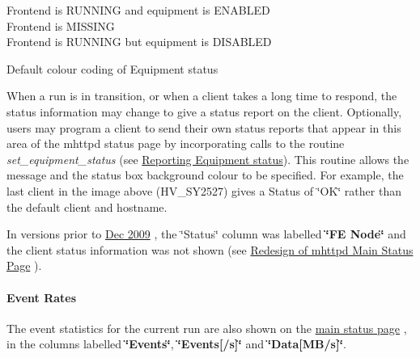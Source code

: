 \begin{center} \begin{table}[h]\begin{TabularC}{1}
\hline
Frontend is RUNNING and equipment is ENABLED  \\
Frontend is MISSING   \\
Frontend is RUNNING but equipment is DISABLED \\
\end{TabularC}
\centering
\caption{Default colour coding of Equipment status }
\end{table}
\par
 \end{center} 

When a run is in transition, or when a client takes a long time to respond, the status information may change to give a status report on the client. Optionally, users may program a client to send their own status reports that appear in this area of the mhttpd status page by incorporating calls to the routine {\itshape set\_\-equipment\_\-status\/} (see \hyperlink{FE_sequence_FE_frontend_status}{Reporting Equipment status}). This routine allows the message and the status box background colour to be specified. For example, the last client in the image above (HV\_\-SY2527) gives a Status of \char`\"{}OK\char`\"{} rather than the default client and hostname.

In versions prior to \hyperlink{NDF_ndf_dec_2009}{Dec 2009} , the \char`\"{}Status\char`\"{} column was labelled {\bfseries \char`\"{}FE Node\char`\"{}} and the client status information was not shown (see \hyperlink{RC_mhttpd_status_page_redesign}{Redesign of mhttpd Main Status Page} ).

\par


\par
 \label{RC_mhttpd_status_page_features_idx_mhttpd_page_status_event-rate}
\hypertarget{RC_mhttpd_status_page_features_idx_mhttpd_page_status_event-rate}{}
 \hypertarget{RC_mhttpd_status_page_features_RC_mhttpd_status_Event_Rates}{}\paragraph{Event Rates}\label{RC_mhttpd_status_page_features_RC_mhttpd_status_Event_Rates}
The event statistics for the current run are also shown on the \hyperlink{RC_mhttpd_status_page_features_RC_mhttpd_status_Equipment_info}{main status page} , in the columns labelled {\bfseries \char`\"{}Events\char`\"{}}, {\bfseries \char`\"{}Events\mbox{[}/s\mbox{]}\char`\"{}} and {\bfseries \char`\"{}Data\mbox{[}MB/s\mbox{]}\char`\"{}}.

